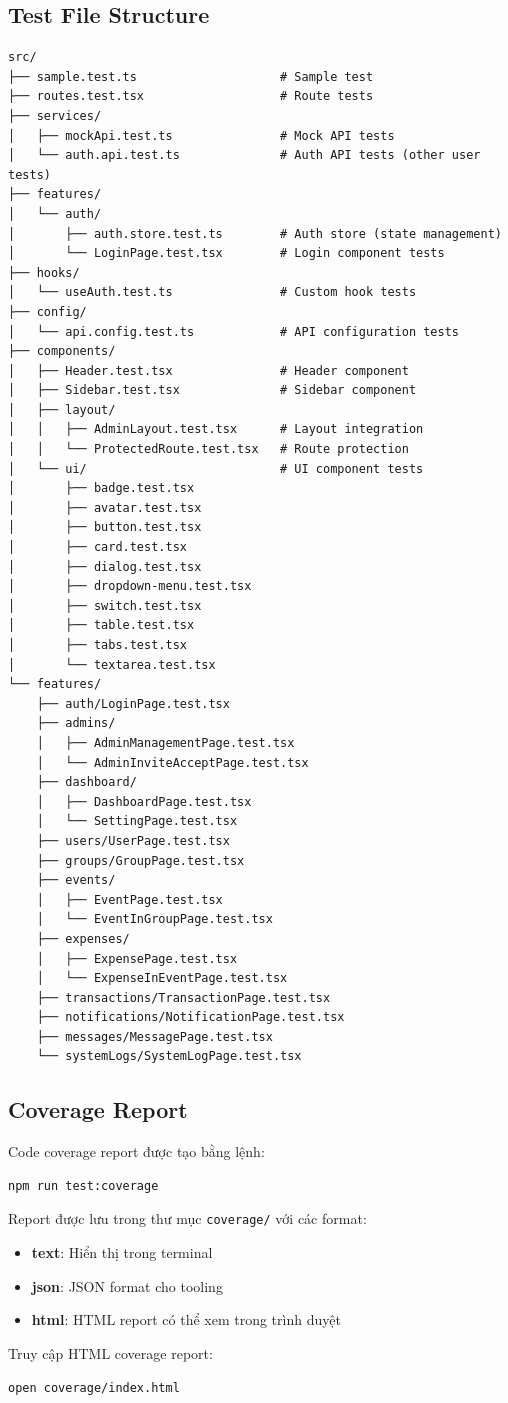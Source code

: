 \documentclass[12pt,a4paper,vietnamese]{article}
\begin{document}
\subsection{Test File Structure}

\begin{verbatim}
src/
├── sample.test.ts                    # Sample test
├── routes.test.tsx                   # Route tests
├── services/
│   ├── mockApi.test.ts               # Mock API tests
│   └── auth.api.test.ts              # Auth API tests (other user tests)
├── features/
│   └── auth/
│       ├── auth.store.test.ts        # Auth store (state management)
│       └── LoginPage.test.tsx        # Login component tests
├── hooks/
│   └── useAuth.test.ts               # Custom hook tests
├── config/
│   └── api.config.test.ts            # API configuration tests
├── components/
│   ├── Header.test.tsx               # Header component
│   ├── Sidebar.test.tsx              # Sidebar component
│   ├── layout/
│   │   ├── AdminLayout.test.tsx      # Layout integration
│   │   └── ProtectedRoute.test.tsx   # Route protection
│   └── ui/                           # UI component tests
│       ├── badge.test.tsx
│       ├── avatar.test.tsx
│       ├── button.test.tsx
│       ├── card.test.tsx
│       ├── dialog.test.tsx
│       ├── dropdown-menu.test.tsx
│       ├── switch.test.tsx
│       ├── table.test.tsx
│       ├── tabs.test.tsx
│       └── textarea.test.tsx
└── features/
    ├── auth/LoginPage.test.tsx
    ├── admins/
    │   ├── AdminManagementPage.test.tsx
    │   └── AdminInviteAcceptPage.test.tsx
    ├── dashboard/
    │   ├── DashboardPage.test.tsx
    │   └── SettingPage.test.tsx
    ├── users/UserPage.test.tsx
    ├── groups/GroupPage.test.tsx
    ├── events/
    │   ├── EventPage.test.tsx
    │   └── EventInGroupPage.test.tsx
    ├── expenses/
    │   ├── ExpensePage.test.tsx
    │   └── ExpenseInEventPage.test.tsx
    ├── transactions/TransactionPage.test.tsx
    ├── notifications/NotificationPage.test.tsx
    ├── messages/MessagePage.test.tsx
    └── systemLogs/SystemLogPage.test.tsx
\end{verbatim}

\subsection{Coverage Report}

Code coverage report được tạo bằng lệnh:
\begin{verbatim}
npm run test:coverage
\end{verbatim}

Report được lưu trong thư mục \texttt{coverage/} với các format:
\begin{itemize}
    \item \textbf{text}: Hiển thị trong terminal
    \item \textbf{json}: JSON format cho tooling
    \item \textbf{html}: HTML report có thể xem trong trình duyệt
\end{itemize}

Truy cập HTML coverage report:
\begin{verbatim}
open coverage/index.html
\end{verbatim}
\end{document}
